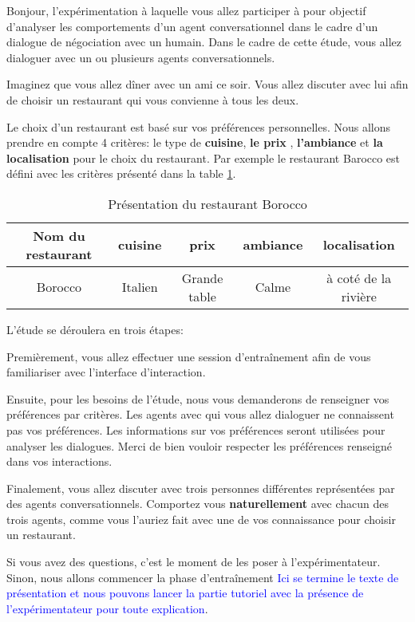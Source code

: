\documentclass [french]{paper}
\begin{document}
				Bonjour, l’expérimentation à laquelle vous allez participer à pour objectif d'analyser les comportements d’un agent conversationnel dans le cadre d’un dialogue de négociation avec un humain.
				Dans le cadre de cette étude, vous allez dialoguer avec un ou plusieurs agents conversationnels.
				
				Imaginez que vous allez dîner avec un ami ce soir. Vous allez discuter avec lui afin de choisir un restaurant qui vous convienne à tous les deux.
				
				Le choix d'un restaurant est basé sur vos préférences personnelles. Nous allons prendre en compte 4 critères: le type de \textbf{cuisine}, \textbf{le prix} , \textbf{l'ambiance} et \textbf{la localisation} pour le choix du restaurant. Par exemple le restaurant Barocco est défini avec les critères présenté dans la table \ref{teb:exfr}.
				\begin{table}[h]
					\begin{tabular} {|c|c|c|c|c|}
						\hline
						Nom du restaurant & cuisine & prix & ambiance& localisation \\
						\hline
						Borocco & Italien & Grande table & Calme & à coté de la rivière \\
						\hline 
					\end{tabular}
					\label{teb:exfr}
					\caption{Présentation du restaurant Borocco}
				\end{table}
				
				L'étude se déroulera en trois étapes:
				
				Premièrement, vous allez effectuer une session d'entraînement afin de vous familiariser avec l'interface d'interaction.
				
				Ensuite, pour les besoins de l'étude, nous vous demanderons de renseigner vos préférences par critères. Les agents avec qui vous allez dialoguer ne connaissent pas vos préférences. Les informations sur vos préférences seront utilisées pour analyser les dialogues. Merci de bien vouloir respecter les préférences renseigné dans vos interactions.
				
				Finalement, vous allez discuter avec trois personnes différentes représentées par des agents conversationnels.  Comportez vous \textbf{naturellement} avec chacun des trois agents, comme vous l'auriez fait avec une de vos connaissance pour choisir un restaurant.  
				
				
				Si vous avez des questions, c'est le moment de les poser à l'expérimentateur. Sinon, nous allons commencer la phase d'entraînement 
				\textcolor{blue}{Ici se termine le texte de présentation et nous pouvons lancer la partie tutoriel avec la présence de l'expérimentateur pour toute explication}.
				
\end{document}
